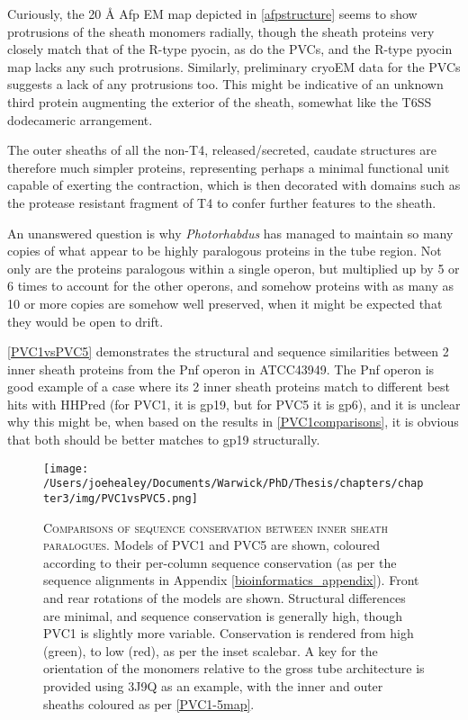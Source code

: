 Curiously, the 20 \AA{} Afp EM map depicted in \vref{afpstructure} seems to show protrusions of the sheath monomers radially, though the sheath proteins very closely match that of the R-type pyocin, as do the PVCs, and the R-type pyocin map lacks any such protrusions. Similarly, preliminary cryoEM data for the PVCs suggests a lack of any protrusions too. This might be indicative of an unknown third protein augmenting the exterior of the sheath, somewhat like the T6SS dodecameric arrangement.

The outer sheaths of all the non-T4, released/secreted, caudate structures are therefore much simpler proteins, representing perhaps a minimal functional unit capable of exerting the contraction, which is then decorated with domains such as the protease resistant fragment of T4 to confer further features to the sheath.


\label{duptrip}
An unanswered question is why \emph{Photorhabdus} has managed to maintain so many copies of what appear to be highly paralogous proteins in the tube region. Not only are the proteins paralogous within a single operon, but multiplied up by 5 or 6 times to account for the other operons, and somehow proteins with as many as 10 or more copies are somehow well preserved, when it might be expected that they would be open to drift.

\vref{PVC1vsPVC5} demonstrates the structural and sequence similarities between 2 inner sheath proteins from the Pnf operon in \Pasy{} ATCC43949. The Pnf operon is good example of a case where its 2 inner sheath proteins match to different best hits with HHPred (for PVC1, it is gp19, but for PVC5 it is gp6), and it is unclear why this might be, when based on the results in \vref{PVC1comparisons}, it is obvious that both should be better matches to gp19 structurally.

\begin{figure}[h]
 \thispagestyle{augment}
 \centering
 \texttt{[image: /Users/joehealey/Documents/Warwick/PhD/Thesis/chapters/chapter3/img/PVC1vsPVC5.png]}
 \captionsetup{singlelinecheck=off, justification=justified, font=footnotesize, aboveskip=10pt}
 \caption[PVC1 and PVC5 paralogue conservation comparison]{\textsc{\normalsize Comparisons of sequence conservation between inner sheath paralogues.}\vspace{0.1cm} \newline Models of PVC1 and PVC5 are shown, coloured according to their per-column sequence conservation (as per the sequence alignments in Appendix \ref{bioinformatics_appendix}). Front and rear rotations of the models are shown. Structural differences are minimal, and sequence conservation is generally high, though PVC1 is slightly more variable. Conservation is rendered from high (green), to low (red), as per the inset scalebar. A key for the orientation of the monomers relative to the gross tube architecture is provided using 3J9Q as an example, with the inner and outer sheaths coloured as per \vref{PVC1-5map}.}
	\label{PVC1vsPVC5}
\end{figure}

